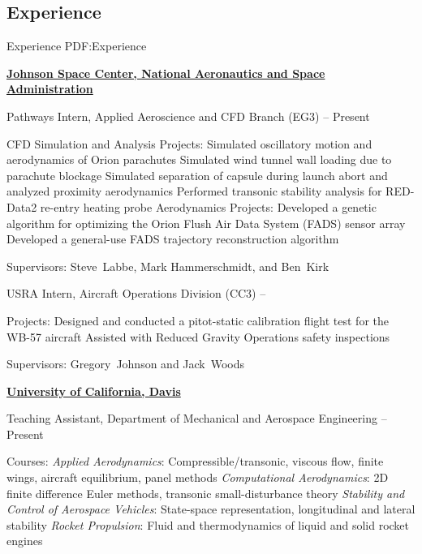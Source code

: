 \documentclass[letterpaper,MMMyyyy,nonstop]{simpleresumecv}
\begin{document}
\begin{body}
\section
{Experience}
{Experience}
{PDF:Experience}

\href{https://www.nasa.gov/centers/johnson/home/index.html}
{\textbf{Johnson Space Center,
National Aeronautics and Space Administration}}

\GapNoBreak
\BulletItem
Pathways Intern, Applied Aeroscience and CFD Branch (EG3)
\hfill
{} --
Present
\begin{detail}
\SubItem
CFD Simulation and Analysis Projects:
\SubBulletItem
Simulated oscillatory motion and aerodynamics of Orion parachutes
\SubBulletItem
Simulated wind tunnel wall loading due to parachute blockage
\SubBulletItem
Simulated separation of capsule during launch abort and analyzed proximity aerodynamics
\SubBulletItem
Performed transonic stability analysis for RED-Data2 re-entry heating probe
\SubItem
Aerodynamics Projects:
\SubBulletItem
Developed a genetic algorithm for optimizing the Orion Flush Air Data System (FADS) sensor array
\SubBulletItem
Developed a general-use FADS trajectory reconstruction algorithm

\SubItem
Supervisors:
Steve~Labbe, Mark Hammerschmidt, and
Ben~Kirk
\end{detail}

\GapNoBreak
\BulletItem
USRA Intern, Aircraft Operations Division (CC3)
\hfill
{} --
\begin{detail}
\SubItem
Projects:
\SubBulletItem
Designed and conducted a pitot-static calibration flight test for the WB-57 aircraft
\SubBulletItem
Assisted with Reduced Gravity Operations safety inspections

\SubItem
Supervisors:
Gregory~Johnson and
Jack~Woods
\end{detail}


\Gap

\href{http://mae.ucdavis.edu/}
{\textbf{University of California, Davis}}

\GapNoBreak
\BulletItem
Teaching Assistant, Department of Mechanical and Aerospace Engineering
\hfill
{} --
Present
\begin{detail}
\SubItem
Courses:
\SubBulletItem
\emph{Applied Aerodynamics}:  Compressible/transonic, viscous flow, finite wings, aircraft equilibrium, panel methods
\SubBulletItem
\emph{Computational Aerodynamics}:  2D finite difference Euler methods, transonic small-disturbance theory
\SubBulletItem
\emph{Stability and Control of Aerospace Vehicles}:  State-space representation, longitudinal and lateral stability
\SubBulletItem
\emph{Rocket Propulsion}:  Fluid and thermodynamics of liquid and solid rocket engines


\end{detail}
\end{body}
\end{document}
